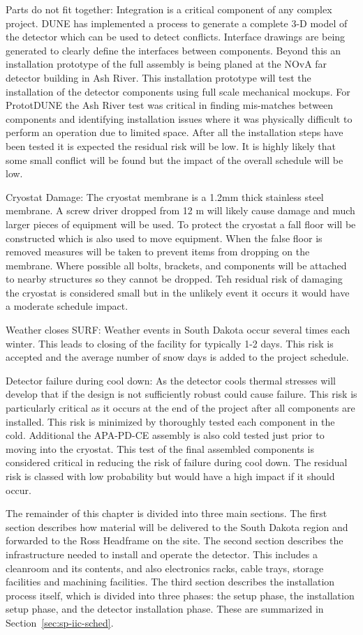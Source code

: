 Parts do not fit together:
Integration is a critical component of any complex project. DUNE has implemented a process to generate a complete 3-D model of the detector which can be used to detect conflicts. Interface drawings are being generated to clearly define the interfaces between components. Beyond this an installation prototype of the full assembly is being planed at the NOvA far detector building in Ash River. This installation prototype will test the installation of the detector components using full scale mechanical mockups. For PrototDUNE the Ash River test was critical in finding mis-matches between components and identifying installation issues where it was physically difficult to perform an operation due to limited space. After all the installation steps have been tested it is expected the residual risk will be low. It is highly likely that some small conflict will be found but the impact of the overall schedule will be low.

Cryostat Damage:
The cryostat membrane is a 1.2mm thick stainless steel membrane. A screw driver dropped from 12 m will likely cause damage and much larger pieces of equipment will be used. To protect the cryostat a fall floor will be constructed which is also used to move equipment. When the false floor is removed measures will be taken to prevent items from dropping on the membrane. Where possible all bolts, brackets, and components will be attached to nearby structures so they cannot be dropped. Teh residual risk of damaging the cryostat is considered small but in the unlikely event it occurs it would have a moderate schedule impact.

Weather closes SURF: 
Weather events in South Dakota occur several times each winter. This leads to closing of the facility for typically 1-2 days. This risk is accepted and the average number of snow days is added to the project schedule.

Detector failure during cool down: 
As the detector cools thermal stresses will develop that if the design is not sufficiently robust could cause failure. This risk is particularly critical as it occurs at the end of the project after all components are installed. This risk is minimized by thoroughly tested each component in the cold. Additional the APA-PD-CE assembly is also cold tested just prior to moving into the cryostat. This test of the final assembled components is considered critical in reducing the risk of failure during cool down. The residual risk is classed with low probability but would have a high impact if it should occur.

The remainder of this chapter is divided into three main sections. 
The first section describes how material will be delivered to the South Dakota region and forwarded to the Ross Headframe on the  site. 
The second section describes the infrastructure needed to install and operate the detector. This includes a cleanroom and its contents, and also electronics racks, cable trays, storage facilities and machining facilities. 
The third section describes the installation process itself, which is divided into three phases: the  setup phase, the installation setup phase, and the detector installation phase. These are summarized in Section~\ref{sec:sp-iic-sched}.
